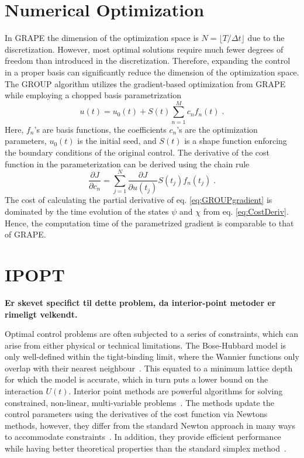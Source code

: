 \section{Numerical Optimization}

In GRAPE the dimension of the optimization space is $N = \lfloor T / \Delta t \rfloor$ due to the discretization. However, most optimal solutions require much fewer degrees of freedom than introduced in the discretization. Therefore, expanding the control in a proper basis can significantly reduce the dimension of the optimization space.
The GROUP algorithm utilizes the gradient-based optimization from GRAPE while employing a chopped basis parametrization 
\begin{equation}
	u(t) = u_0 (t) + S(t) \sum_{n=1}^{M} c_n f_n (t) \; . \label{eq:controlParametrization}
\end{equation}
Here, $f_n$'s are basis functions, the coefficients $c_n$'s are the optimization parameters, $u_0 (t)$ is the initial seed, and $S(t)$ is a shape function enforcing the boundary conditions of the original control. The derivative of the cost function in the parameterization can be derived using the chain rule
\begin{equation}
	\frac{\partial J }{\partial c_n} = \sum_{j = 1}^{N} \frac{\partial J }{\partial u(t_j)} S(t_j) f_n(t_j) \; . \label{eq:GROUPgradient} 
\end{equation}
The cost of calculating the partial derivative of eq. \eqref{eq:GROUPgradient} is dominated by the time evolution of the states $\psi$ and $\chi$ from eq. \eqref{eq:CostDeriv}. Hence, the computation time of the parametrized gradient is comparable to that of GRAPE.


\section{IPOPT}

\textbf{Er skevet specifict til dette problem, da interior-point metoder er rimeligt velkendt.}

Optimal control problems are often subjected to a series of constraints, which can arise from either physical or technical limitations. The Bose-Hubbard model is only well-defined within the tight-binding limit, where the Wannier functions only overlap with their nearest neighbour~\cite{bloch2008many}. This equated to a minimum lattice depth for which the model is accurate, which in turn puts a lower bound on the interaction $U(t)$.
Interior point methods are powerful algorithms for solving constrained, non-linear, multi-variable problems~\cite{NocedalWright2006}. The methods update the control parameters using the derivatives of the cost function via Newtons methods, however, they differ from the standard Newton approach in many ways to accommodate constraints~\cite{Karmarkar1984,Wachter2006}. In addition, they provide efficient performance while having better theoretical properties than the standard simplex method~\cite{NocedalWright2006}.\\ 

